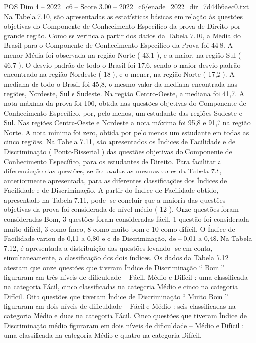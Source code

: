 \begin{textsample}{POS Dim 4 – 2022\_c6 – Score 3.00 – 2022\_c6/enade\_2022\_dir\_7d44b6aec0.txt}
Na Tabela 7.10, são apresentadas as estatísticas básicas em relação às questões objetivas do Componente de Conhecimento Específico da prova de Direito por grande região.
Como se verifica a partir dos dados da Tabela 7.10, a Média do Brasil para o Componente de Conhecimento Específico da Prova foi 44,8.
A menor Média foi observada na região Norte ( 43,1 ), e a maior, na região Sul ( 46,7 ).
O desvio-padrão de todo o Brasil foi 17,6, sendo o maior desvio-padrão encontrado na região Nordeste ( 18 ), e o menor, na região Norte ( 17,2 ).
A mediana de todo o Brasil foi 45,8, o mesmo valor da mediana encontrada nas regiões, Nordeste, Sul e Sudeste.
Na região Centro-Oeste, a mediana foi 41,7.
A nota máxima da prova foi 100, obtida nas questões objetivas do Componente de Conhecimento Específico, por, pelo menos, um estudante das regiões Sudeste e Sul.
Nas regiões Centro-Oeste e Nordeste a nota máxima foi 95,8 e 91,7 na região Norte.
A nota mínima foi zero, obtida por pelo menos um estudante em todas as cinco regiões.
Na Tabela 7.11, são apresentados os Índices de Facilidade e de Discriminação ( Ponto-Bisserial ) das questões objetivas do Componente de Conhecimento Específico, para os estudantes de Direito.
Para facilitar a diferenciação das questões, serão usadas as mesmas cores da Tabela 7.8, anteriormente apresentada, para as diferentes classificações dos Índices de Facilidade e de Discriminação.
A partir do Índice de Facilidade obtido, apresentado na Tabela 7.11, pode -se concluir que a maioria das questões objetivas da prova foi considerada de nível médio ( 12 ).
Onze questões foram consideradas Bom, 3 questões foram consideradas fácil, 1 questão foi considerada muito difícil, 3 como fraco, 8 como muito bom e 10 como difícil.
O Índice de Facilidade variou de 0,11 a 0,80 e o de Discriminação, de – 0,01 a 0,48.
Na Tabela 7.12, é apresentada a distribuição das questões levando -se em conta, simultaneamente, a classificação dos dois índices.
Os dados da Tabela 7.12 atestam que onze questões que tiveram Índice de Discriminação “ Bom ” figuraram em três níveis de dificuldade – Fácil, Médio e Difícil : uma classificada na categoria Fácil, cinco classificadas na categoria Médio e cinco na categoria Difícil.
Oito questões que tiveram Índice de Discriminação “ Muito Bom ” figuraram em dois níveis de dificuldade – Fácil e Médio : seis classificadas na categoria Médio e duas na categoria Fácil.
Cinco questões que tiveram Índice de Discriminação médio figuraram em dois níveis de dificuldade – Médio e Difícil : uma classificada na categoria Médio e quatro na categoria Difícil.

\end{textsample}
